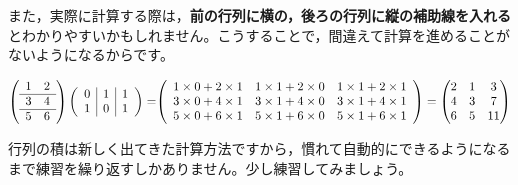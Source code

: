\documentclass{ltjsbook}
\begin{document}
また，実際に計算する際は，\textbf{前の行列に横の，後ろの行列に縦の補助線を入れる}とわかりやすいかもしれません。こうすることで，間違えて計算を進めることがないようになるからです。

\begin{equation*}
    \left(
    \begin{array}{cc}
        1 & 2 \\\hline
        3 & 4 \\\hline
        5 & 6 \\
    \end{array}
    \right)
    \left(
    \begin{array}{c|c|c}
        0 & 1 & 1 \\
        1 & 0 & 1
    \end{array}
    \right)
    =
    $$
    $$
    \left(
    \begin{array}{ccc}
        1 \times 0 + 2 \times 1 & 1 \times 1 + 2 \times 0 & 1 \times 1+2\times 1 \\
        3 \times 0 + 4 \times 1 & 3 \times 1 + 4 \times 0 & 3 \times 1+4\times 1 \\
        5 \times 0 + 6 \times 1 & 5 \times 1 + 6 \times 0 & 5 \times 1+6\times 1 \\
    \end{array}
    \right)
    =
    \begin{pmatrix}
        2 & 1 & 3  \\
        4 & 3 & 7  \\
        6 & 5 & 11
    \end{pmatrix}
\end{equation*}

行列の積は新しく出てきた計算方法ですから，慣れて自動的にできるようになるまで練習を繰り返すしかありません。少し練習してみましょう。
\end{document}
